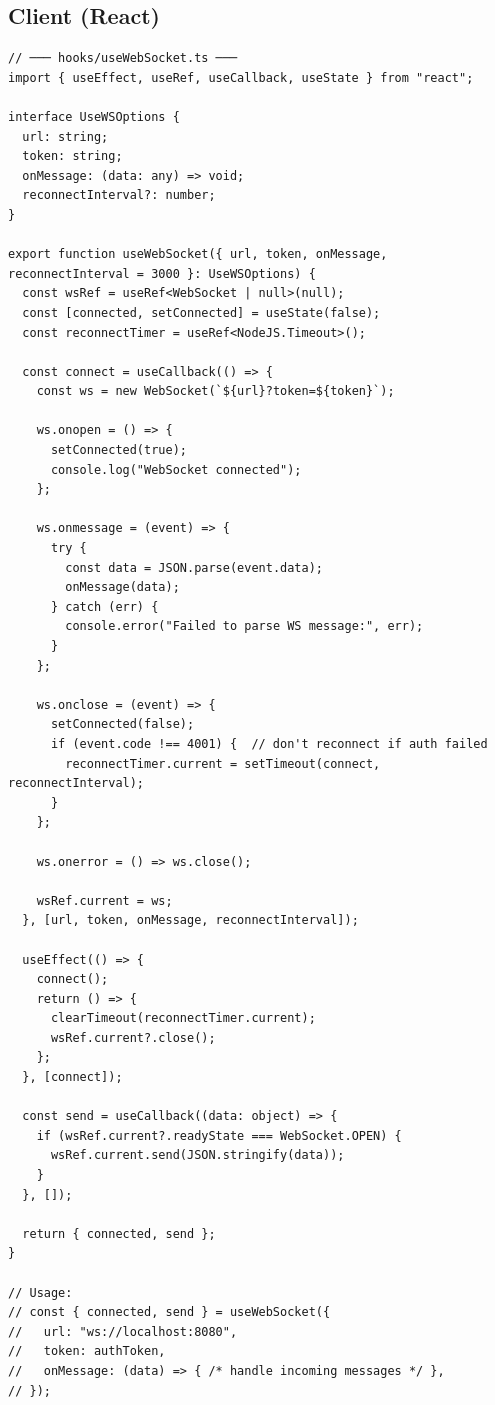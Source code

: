 \documentclass[10pt, a4paper]{article}
\begin{document}
\subsection{Client (React)}


\begin{lstlisting}[language=myjs]
// ─── hooks/useWebSocket.ts ───
import { useEffect, useRef, useCallback, useState } from "react";

interface UseWSOptions {
  url: string;
  token: string;
  onMessage: (data: any) => void;
  reconnectInterval?: number;
}

export function useWebSocket({ url, token, onMessage, reconnectInterval = 3000 }: UseWSOptions) {
  const wsRef = useRef<WebSocket | null>(null);
  const [connected, setConnected] = useState(false);
  const reconnectTimer = useRef<NodeJS.Timeout>();

  const connect = useCallback(() => {
    const ws = new WebSocket(`${url}?token=${token}`);

    ws.onopen = () => {
      setConnected(true);
      console.log("WebSocket connected");
    };

    ws.onmessage = (event) => {
      try {
        const data = JSON.parse(event.data);
        onMessage(data);
      } catch (err) {
        console.error("Failed to parse WS message:", err);
      }
    };

    ws.onclose = (event) => {
      setConnected(false);
      if (event.code !== 4001) {  // don't reconnect if auth failed
        reconnectTimer.current = setTimeout(connect, reconnectInterval);
      }
    };

    ws.onerror = () => ws.close();

    wsRef.current = ws;
  }, [url, token, onMessage, reconnectInterval]);

  useEffect(() => {
    connect();
    return () => {
      clearTimeout(reconnectTimer.current);
      wsRef.current?.close();
    };
  }, [connect]);

  const send = useCallback((data: object) => {
    if (wsRef.current?.readyState === WebSocket.OPEN) {
      wsRef.current.send(JSON.stringify(data));
    }
  }, []);

  return { connected, send };
}

// Usage:
// const { connected, send } = useWebSocket({
//   url: "ws://localhost:8080",
//   token: authToken,
//   onMessage: (data) => { /* handle incoming messages */ },
// });
\end{lstlisting}
\end{document}

